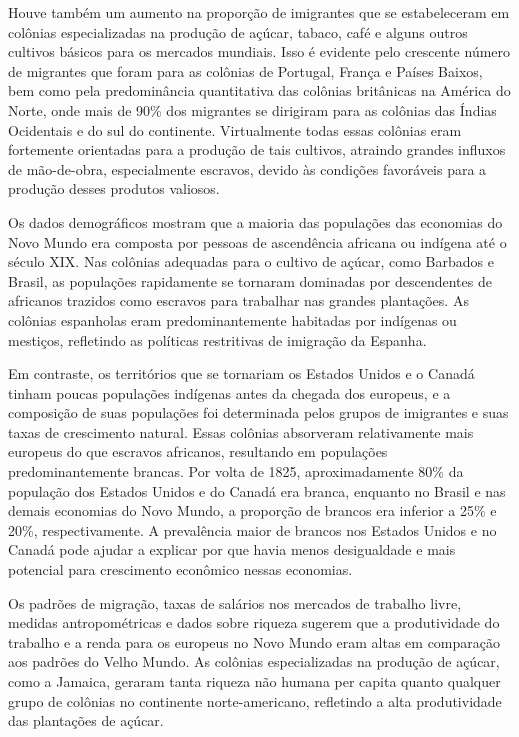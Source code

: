 \documentclass[a4paper,12pt]{article}[abntex2]
\begin{document}
Houve também um aumento na proporção de imigrantes que se estabeleceram em colônias especializadas na produção de açúcar, tabaco, café e alguns outros cultivos básicos para os mercados mundiais. Isso é evidente pelo crescente número de migrantes que foram para as colônias de Portugal, França e Países Baixos, bem como pela predominância quantitativa das colônias britânicas na América do Norte, onde mais de 90\% dos migrantes se dirigiram para as colônias das Índias Ocidentais e do sul do continente. Virtualmente todas essas colônias eram fortemente orientadas para a produção de tais cultivos, atraindo grandes influxos de mão-de-obra, especialmente escravos, devido às condições favoráveis para a produção desses produtos valiosos.

Os dados demográficos mostram que a maioria das populações das economias do Novo Mundo era composta por pessoas de ascendência africana ou indígena até o século XIX. Nas colônias adequadas para o cultivo de açúcar, como Barbados e Brasil, as populações rapidamente se tornaram dominadas por descendentes de africanos trazidos como escravos para trabalhar nas grandes plantações. As colônias espanholas eram predominantemente habitadas por indígenas ou mestiços, refletindo as políticas restritivas de imigração da Espanha.

Em contraste, os territórios que se tornariam os Estados Unidos e o Canadá tinham poucas populações indígenas antes da chegada dos europeus, e a composição de suas populações foi determinada pelos grupos de imigrantes e suas taxas de crescimento natural. Essas colônias absorveram relativamente mais europeus do que escravos africanos, resultando em populações predominantemente brancas. Por volta de 1825, aproximadamente 80\% da população dos Estados Unidos e do Canadá era branca, enquanto no Brasil e nas demais economias do Novo Mundo, a proporção de brancos era inferior a 25\% e 20\%, respectivamente. A prevalência maior de brancos nos Estados Unidos e no Canadá pode ajudar a explicar por que havia menos desigualdade e mais potencial para crescimento econômico nessas economias.

Os padrões de migração, taxas de salários nos mercados de trabalho livre, medidas antropométricas e dados sobre riqueza sugerem que a produtividade do trabalho e a renda para os europeus no Novo Mundo eram altas em comparação aos padrões do Velho Mundo. As colônias especializadas na produção de açúcar, como a Jamaica, geraram tanta riqueza não humana per capita quanto qualquer grupo de colônias no continente norte-americano, refletindo a alta produtividade das plantações de açúcar.
\end{document}
